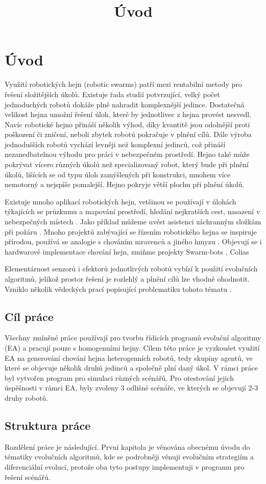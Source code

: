 \chapter*{Úvod}

\title{Úvod}
Využití robotických hejn (robotic swarms) patří mezi rentabilní metody pro řešení složitějších úkolů. Existuje řada studií potvrzující, velký počet jednoduchých robotů dokáže plně nahradit komplexnější jedince. Dostatečná velikost hejna umožní řešení úloh, které by jednotlivec z hejna provést nesvedl. Navíc robotické hejno přináší několik výhod, díky kvantitě jsou odolnější proti poškození či zničení, neboli zbytek robotů pokračuje v plnění cílů. Dále výroba jednodušších robotů vychází levněji než komplexní jedinců, což přináší nezanedbatelnou výhodu pro práci v nebezpečném prostředí. Hejno také může pokrývat vícero různých úkolů než specializovaný robot, který bude při plnění úkolů, lišících se od typu úloh zamýšlených při konstrukci, mnohem více nemotorný a nejspíše pomalejší. Hejno pokryje větší plochu při plnění úkolů. 
\par
Existuje mnoho aplikací robotických hejn, vetšinou se používají v úlohách týkajících se průzkumu a mapování prostředí, hledání nejkratších cest, nasazení v nebezpečných místech \citep{swarmApp}. Jako příklad můžeme uvést asistenci záchranným složkám při požáru \citep{fireRobots}. Mnoho projektů zabývající se řízením robotického hejna se inspiruje přírodou, používá se analogie s chováním mravenců a jiného hmyzu \citep{PheroRobot}. Objevují se i hardwarové implementace chování hejn, zmiňme projekty Swarm-bots \citep{swarmBots}, Colias \citep{Colias}  
\par 
Elementárnost senzorů i efektorů jednotlivých robotů vybízí k použití evolučních algoritmů, jelikož prostor řešení je rozlehlý a plnění cílů lze vhodně ohodnotit. Vzniklo několik vědeckých prací popisující problematiku tohoto tématu \citep{ENovel} \citep{geneticSwarm}.
\section*{Cíl práce}
Všechny zmíněné práce používají pro tvorbu řídicích programů evoluční algoritmy (EA) a pracují pouze s homogenními hejny. Cílem této práce je vyzkoušet využití EA na generování chování hejna heterogenních robotů, tedy skupiny agentů, ve které se objevuje několik druhů jedinců a společně plní daný úkol. V rámci práce byl vytvořen program pro simulaci různých scénářů. Pro otestování jejich úspěšnosti v rámci EA, byly zvoleny 3 odlišné scénáře, ve kterých se objevují 2-3 druhy robotů.
\section*{Struktura práce}
Rozdělení práce je následující. První kapitola je věnována obecnému úvodu do tématiky evolučních algoritmů, kde se podrobněji věnuji evolučním strategiím a diferenciální evoluci, protože oba tyto postupy implementuji v programu pro řešení scénářů. 